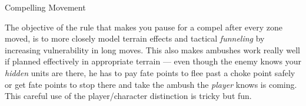 \begin{sidebox}{Compelling Movement}

The objective of the rule that makes you pause for a compel after every zone moved, is to more closely model terrain effects and tactical \emph{funneling} by increasing vulnerability in long moves. This also makes ambushes work really well if planned effectively in appropriate terrain --- even though the enemy knows your \emph{hidden} units are there, he has to pay fate points to flee past a choke point safely or get fate points to stop there and take the ambush the \emph{player} knows is coming. This careful use of the player/character distinction is tricky but fun.
\end{sidebox}

